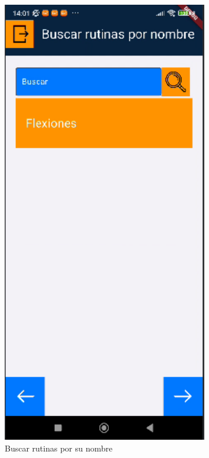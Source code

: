 \begin{figure}[H]
   \centering
    \includegraphics[width=0.8\textwidth]{pantallas/buscarRutina.png}
    \caption{Buscar rutinas por su nombre}
    \label{fig:buscarRutina}
\end{figure}

